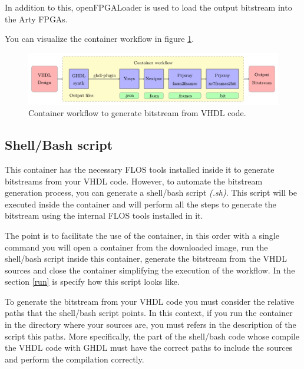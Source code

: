 \noindent In addition to this, openFPGALoader \cite{gh:openFPGALoader} is used to load the output bitstream into the Arty FPGAs.

\vspace{5mm}

\noindent You can visualize the container workflow in figure \ref{fig:workf}. 

\begin{figure}[H]
    \centering
    \includegraphics[width=151mm]{figures/container_workflow.pdf}
    \caption{Container workflow to generate bitstream from VHDL code.}
    \label{fig:workf}
\end{figure}

\subsection{Shell/Bash script}

This container has the necessary FLOS tools installed inside it to generate bitstreams from your VHDL code. 
However, to automate the bitstream generation process, you can generate a shell/bash script \textit{(.sh)}.
This script will be executed inside the container and will perform all the steps to generate the bitstream using the internal FLOS tools installed in it.

\vspace{5mm}

\noindent The point is to facilitate the use of the container, in this order with a single command you will open a container from the downloaded image, run the shell/bash script inside this container, generate the bitstream from the VHDL sources and close the container simplifying the execution of the workflow.
In the section \ref{run} is specify how this script looks like.

\vspace{5mm}

\noindent To generate the bitstream from your VHDL code you must consider the relative paths that the shell/bash script points. 
In this context, if you run the container in the directory where your sources are, you must refers in the description of the script this paths.
More specifically, the part of the shell/bash code whose compile the VHDL code with GHDL must have the correct paths to include the sources and perform the compilation correctly.

